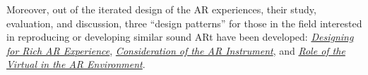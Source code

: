 \begin{SingleSpace}
    Moreover, out of the iterated design of the AR experiences, their study, evaluation, and discussion, three ``design patterns'' for those in the field interested in reproducing or developing similar sound ARt have been developed: \textit{\href{https://thexrt.space/design-patterns/rich-ar}{Designing for Rich AR Experience}}, \textit{\href{https://thexrt.space/design-patterns/ar-instrument}{Consideration of the AR Instrument}}, and \textit{\href{https://thexrt.space/design-patterns/virtual-role}{Role of the Virtual in the AR Environment}}.    
\end{SingleSpace}
